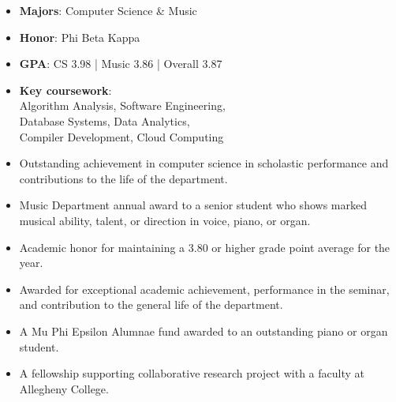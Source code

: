 \documentclass[10pt,a4paper,ragged2e]{altacv}
\begin{document}
\begin{itemize}
\item \textbf{Majors}: Computer Science \& Music
\item \textbf{Honor}: Phi Beta Kappa
\item \textbf{GPA}: CS 3.98 | Music 3.86 | Overall 3.87
\item \textbf{Key coursework}:\\ Algorithm Analysis, Software Engineering, \\ Database Systems, Data Analytics, \\ Compiler Development, Cloud Computing
\end{itemize}
\begin{itemize}
\item Outstanding achievement in computer science in scholastic performance and contributions to the life of the department.
\end{itemize}
\smallskip
{}
\begin{itemize}
\item Music Department annual award to a senior student who shows marked musical ability, talent, or direction in voice, piano, or organ.
\end{itemize}
\smallskip
{}
\begin{itemize}
\item Academic honor for maintaining a 3.80 or higher grade point average for the year.
\end{itemize}
\smallskip
{}
\begin{itemize}
\item Awarded for exceptional academic achievement, performance in the seminar, and contribution to the general life of the department.
\end{itemize}
\smallskip
{}
\begin{itemize}
\item A Mu Phi Epsilon Alumnae fund awarded to an outstanding piano or organ student.
\end{itemize}
\smallskip
{}
\begin{itemize}
\item A fellowship supporting collaborative research project with a faculty at Allegheny College.
\end{itemize}
\end{document}

